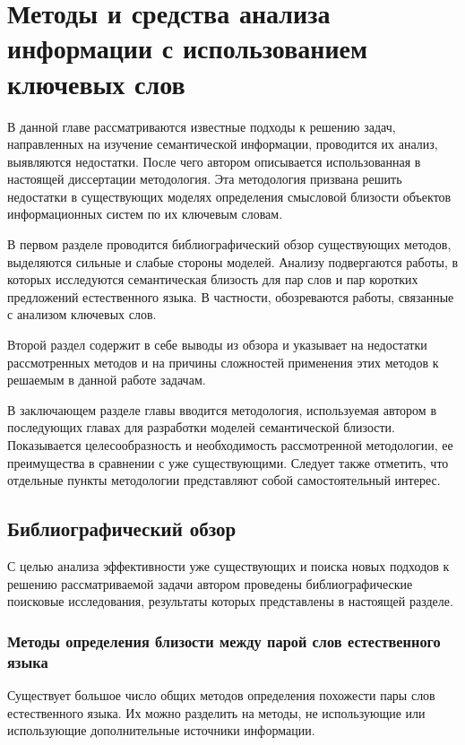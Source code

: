 \chapter{Методы и средства анализа информации с использованием ключевых слов} \label{chapt_related_work}
В данной главе рассматриваются известные подходы к решению задач, направленных на изучение семантической информации, проводится их анализ, выявляются недостатки. После чего автором описывается использованная в настоящей диссертации методология. Эта методология призвана решить недостатки в существующих моделях определения смысловой близости объектов информационных систем по их ключевым словам.

В первом разделе проводится библиографический обзор существующих методов, выделяются сильные и слабые стороны моделей. Анализу подвергаются работы, в которых исследуются семантическая близость для пар слов и пар коротких предложений естественного языка. В частности, обозреваются работы, связанные с анализом ключевых слов.

Второй раздел содержит в себе выводы из обзора и указывает на недостатки рассмотренных методов и на причины сложностей применения этих методов к решаемым в данной работе задачам.

В заключающем разделе главы вводится методология, используемая автором в последующих главах для разработки моделей семантической близости. Показывается целесообразность и необходимость рассмотренной методологии, ее преимущества в сравнении с уже существующими. Следует также отметить, что отдельные пункты методологии представляют собой самостоятельный интерес.

\section{Библиографический обзор}

С целью анализа эффективности уже существующих и поиска новых подходов к решению рассматриваемой задачи автором проведены библиографические поисковые исследования, результаты которых представлены в настоящей разделе.

\subsection{Методы определения близости между парой слов естественного языка}


Существует большое число общих методов определения похожести пары слов естественного языка. Их можно разделить на методы, не использующие или использующие дополнительные источники информации. 

